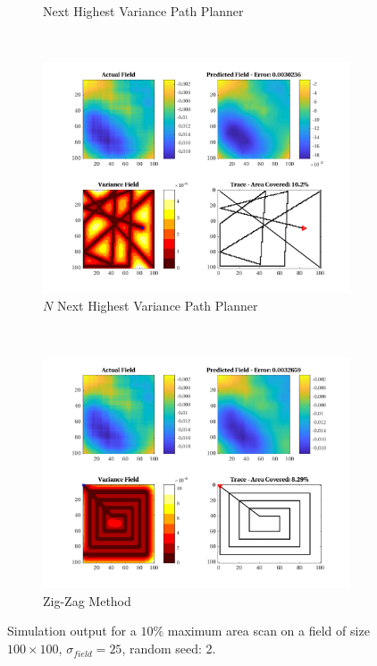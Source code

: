 \begin{figure}[htb!]
\begin{subfigure}[t]{0.5\textwidth}
        \captionsetup{skip=0.10\baselineskip,size=footnotesize}
        \caption{Next Highest Variance Path Planner}
    \end{subfigure}%
    \\
    \begin{subfigure}[t]{0.5\textwidth}
        \centering
        \includegraphics[width=\linewidth]{figures/hbresults/nnhv_10p_100x100_sf_25_seed_2.png}
        \captionsetup{skip=0.10\baselineskip,size=footnotesize}
        \caption{$N$ Next Highest Variance Path Planner}
    \end{subfigure}%
    ~
    \begin{subfigure}[t]{0.5\textwidth}
        \centering
        \includegraphics[width=\linewidth]{figures/hbresults/zz_10p_100x100_sf_25_seed_2.png}
        \captionsetup{skip=0.10\baselineskip,size=footnotesize}
        \caption{Zig-Zag Method}
    \end{subfigure}%
    \captionsetup{skip=0.20\baselineskip}
    \caption{Simulation output for a $10\%$ maximum area scan on a field of size $100 \times 100$, $\sigma_{field} = 25$, random seed: 2.}
    \label{fig:sim_sigma25_p10_s2}
\end{figure}

